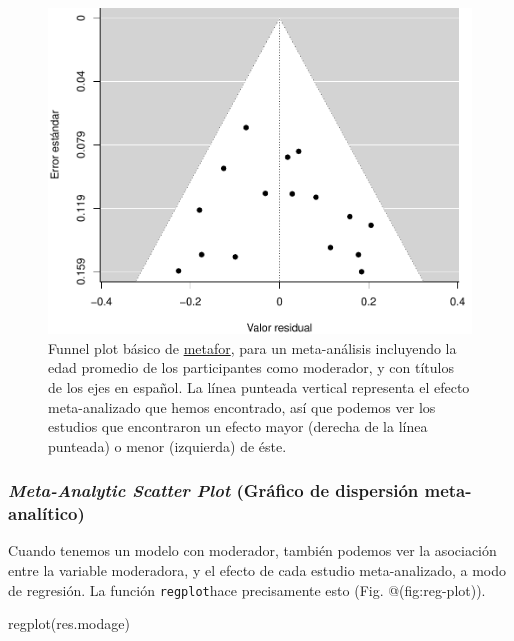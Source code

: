 \documentclass[
  bookmarksnumbered]{article}
\newenvironment{Shaded}{\begin{snugshade}}{\end{snugshade}}
\newcommand{\FunctionTok}[1]{\textcolor[rgb]{0.39,0.29,0.61}{#1}}
\newcommand{\NormalTok}[1]{\textcolor[rgb]{0.12,0.11,0.11}{#1}}
\begin{document}
\begin{figure}
\centering
\includegraphics{Meta-analysis_files/figure-latex/funnel-plot-mod1-1.pdf}
\caption{\label{fig:funnel-plot-mod1}Funnel plot básico de \href{https://www.metafor-project.org/doku.php}{metafor}, para un meta-análisis incluyendo la edad promedio de los participantes como moderador, y con títulos de los ejes en español. La línea punteada vertical representa el efecto meta-analizado que hemos encontrado, así que podemos ver los estudios que encontraron un efecto mayor (derecha de la línea punteada) o menor (izquierda) de éste.}
\end{figure}

\hypertarget{meta-analytic-scatter-plot-gruxe1fico-de-dispersiuxf3n-meta-analuxedtico}{%
\subsubsection{\texorpdfstring{\emph{Meta-Analytic Scatter Plot} (Gráfico de dispersión meta-analítico)}{Meta-Analytic Scatter Plot (Gráfico de dispersión meta-analítico)}}\label{meta-analytic-scatter-plot-gruxe1fico-de-dispersiuxf3n-meta-analuxedtico}}

Cuando tenemos un modelo con moderador, también podemos ver la asociación entre la variable moderadora, y el efecto de cada estudio meta-analizado, a modo de regresión. La función \texttt{regplot}hace precisamente esto (Fig. @(fig:reg-plot)).

\begin{Shaded}
\begin{Highlighting}[]
\FunctionTok{regplot}\NormalTok{(res.modage)}
\end{Highlighting}
\end{Shaded}
\end{document}
